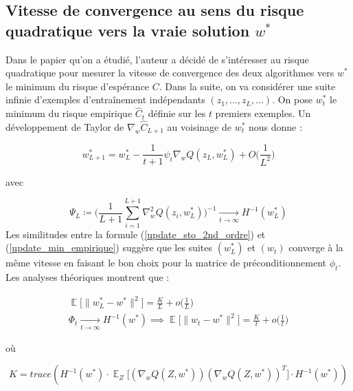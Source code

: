 \documentclass{article}
\DeclareMathOperator*{\E}{\mathbb{E}} %
\begin{document}
\subsection{Vitesse de convergence au sens du risque quadratique vers la vraie solution $w^*$}

Dans le papier \cite{bottou-mlss-2004} qu'on a étudié, l'auteur a décidé de s'intéresser au risque quadratique pour mesurer la vitesse de convergence des deux algorithmes vers $w^*$ le minimum du risque d'espérance $C$. Dans la suite, on va considérer une suite infinie d'exemples d'entraînement indépendants $(z_1,...,z_L,...)$. On pose $w_t^*$ le minimum du risque empirique $\hat{C}_t$ définie sur les $t$ premiers exemples.
Un développement de Taylor de $\nabla_w\hat{C}_{L+1}$ au voisinage de $w_t^*$ nous donne :
    
\begin{equation}\label{update_min_empirique}
    w_{L+1}^*=w_L^*-\frac{1}{t+1}\psi_t\nabla_wQ(z_L,w_L^*)+O\Big(\frac{1}{L^2}\Big)
\end{equation}

avec 

\begin{equation*}
    \Psi_L \coloneqq \bigg(\frac{1}{L+1} \sum_{i=1}^{L+1} \nabla_w^2 Q(z_i, w_L^*)\bigg)^{-1} \underset {t\to\infty} \longrightarrow H^{-1}(w_L^*)
\end{equation*}
Les similitudes entre la formule (\ref{update_sto_2nd_ordre}) et (\ref{update_min_empirique}) suggère que les suites $(w_L^*)$ et $(w_t)$ converge à la même vitesse en faisant le bon choix pour la matrice  de préconditionnement $\phi_t$.
Les analyses théoriques \cite{bottou-lecun-2004} montrent que : 

\begin{equation} \label{eq(29)} 
    \begin{split}
        \E \big[ \lVert w_L^*-w^* \rVert ^2 \big] = \frac{K}{L} + o \Big( \frac{1}{L} \Big) \\
        \Phi_t\underset{t\to\infty}\longrightarrow H^{-1}(w^*) \implies \E \big[\lVert w_t-w^* \rVert^2 \big]= \frac{K}{t}+o\Big(\frac{1}{t}\Big)
    \end{split}
\end{equation}

où

\begin{equation*}
    K=trace(H^{-1}(w^*)\cdot {\textstyle\E_{Z}} \Big [(\nabla_wQ(Z,w^*))(\nabla_wQ(Z,w^*))^T \Big]\cdot H^{-1}(w^*))
\end{equation*}
\end{document}
